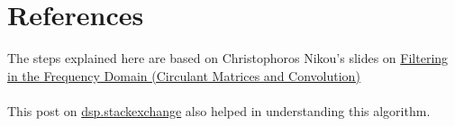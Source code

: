 \documentclass[11pt]{article}
\begin{document}
	\section{References}
	The steps explained here are based on Christophoros Nikou's slides on \href{ http://www.cs.uoi.gr/~cnikou/Courses/Digital_Image_Processing/2010-2011/Chapter_04c_Frequency_Filtering_(Circulant_Matrices).ppt}{Filtering in the Frequency Domain (Circulant Matrices and Convolution)}\\ \\
	This post on \href{https://dsp.stackexchange.com/questions/35373/convolution-as-a-doubly-block-circulant-matrix-operating-on-a-vector/35376#35376}{dsp.stackexchange} also helped in understanding this algorithm.
	

%   
%    
%    
%    
%    
%    
%    
%      
      
    
\end{document}
